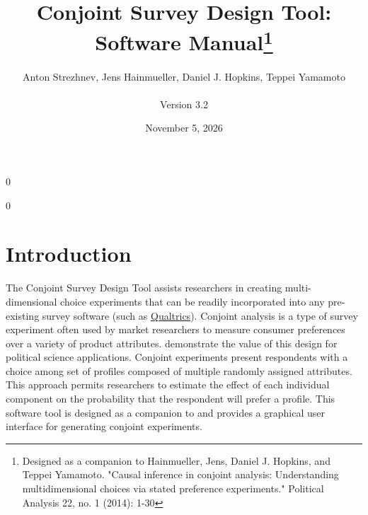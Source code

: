\documentclass[12pt]{article}
\newcommand\spacingset[1]{\renewcommand{\baselinestretch}{#1}\small\normalsize}
\begin{document}

\newcommand{\blind}{0}

\newcommand{\tit}{Conjoint Survey Design Tool: Software Manual\thanks{Designed as a companion to Hainmueller, Jens, Daniel J. Hopkins, and Teppei Yamamoto. "Causal inference in conjoint analysis: Understanding multidimensional choices via stated preference experiments." Political Analysis 22, no. 1 (2014): 1-30}}

\blind
\title{\bf \tit}
  \author{Anton Strezhnev, Jens Hainmueller, Daniel J. Hopkins, Teppei Yamamoto\\\\Version 3.2}

\date{November 5, 2026}
\maketitle
{}\blind
\maketitle
\fi


\thispagestyle{empty}
\setcounter{page}{0}
\spacingset{1}

\clearpage



\spacingset{1.5}

\tableofcontents
\clearpage
\section{Introduction}

The Conjoint Survey Design Tool assists researchers in creating multi-dimensional choice experiments that can be readily incorporated into any pre-existing survey software (such as \href{http://www.qualtrics.com/}{Qualtrics}). Conjoint analysis is a type of survey experiment often used by market researchers to measure consumer preferences over a variety of product attributes. \cite{hainmueller2013} demonstrate the value of this design for political science applications. Conjoint experiments present respondents with a choice among set of profiles composed of multiple randomly assigned attributes. This approach permits researchers to estimate the effect of each individual component on the probability that the respondent will prefer a profile. This software tool is designed as a companion to \cite{hainmueller2013} and provides a graphical user interface for generating conjoint experiments.
\end{document}
